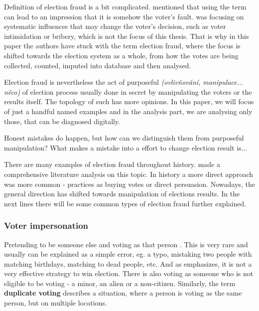 Definition of election fraud is a bit complicated. \citeauthor{Levitt2007} mentioned that using the term  can lead to an impression that it is somehow the voter's fault. \citeauthor{Lehoucq2003} was focusing on systematic influences that may change the voter's decision, such as voter intimidation or bribery, which is not the focus of this thesis. That is why in this paper the authors have stuck with the term election fraud, where the focus is shifted towards the election system as a whole, from how the votes are being collected, counted, imputed into database and then analysed. 

Election fraud is nevertheless the act of purposeful \emph{(ovlivňování, manipulace... něco)} of election process usually  done in secret by manipulating the voters or the results itself. The topology of such has more opinions. In this paper, we will focus of just a handful named examples and in the analysis part, we are analysing only those, that can be diagnosed digitally. \cite{Lebeda2021}



\begin{koment}
Honest mistakes do happen, but how can we distinguish them from purposeful manipulation? 
What makes a mistake into a effort to change election result is...
\end{koment}

There are many examples of election fraud throughout history. \citeauthor{Lehoucq2003} made a comprehensive literature analysis on this topic. In history a more direct approach was more common - practices as buying votes or direct persuasion. Nowadays, the general direction has shifted towards manipulation of elections results. In the next lines there will be some common types of election fraud further explained. \cite{Levitt2007} 

\subsubsection*{Voter impersonation} 
Pretending to be someone else and voting as that person . This is very rare and usually can be explained as a simple error, eg. a typo, mistaking two people with matching birthdays, matching to dead people, etc. And as \citeauthor{Levitt2007} emphasizes, it is not a very effective strategy to win election. There is also voting as someone who is not eligible to be voting - a minor, an alien or a non-citizen. Similarly, the term \textbf{duplicate voting} describes a situation, where a person is voting as the same person, but on multiple locations. \cite{The_Heritage_Foundation_2024}

